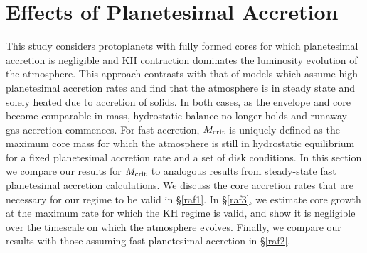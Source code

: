\documentclass[apj]{emulateapj}
\begin{document}



\section{Effects of Planetesimal Accretion}
\label{acc}



This study considers protoplanets with fully formed cores for which planetesimal accretion is negligible and KH contraction dominates the luminosity evolution of the atmosphere. This approach contrasts with that of models which assume high planetesimal accretion rates and find that the atmosphere is in steady state and solely heated due to accretion of solids. In both cases, as the envelope and core become comparable in mass, hydrostatic balance no longer holds and runaway gas accretion commences. For fast accretion, $M_{\rm crit}$ is uniquely defined as the maximum core mass for which the atmosphere is still in hydrostatic equilibrium for a fixed planetesimal accretion rate and a set of disk conditions. In this section we compare our results for $M_{\rm crit}$ to analogous results from steady-state fast planetesimal accretion calculations. We discuss the core accretion rates that are necessary for our regime to be valid in \S\ref{raf1}. In \S\ref{raf3}, we estimate core growth at the maximum rate for which the KH regime is valid, and show it is negligible over the timescale on which the atmosphere evolves. Finally, we compare our results with those assuming fast planetesimal accretion in \S\ref{raf2}.
\end{document}
